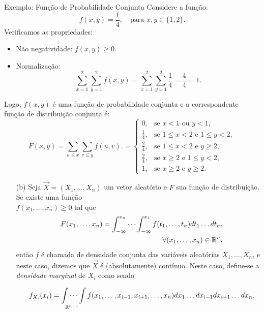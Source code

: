 \begin{frame}{Exemplo: Função de Probabilidade Conjunta}
	Considere a função:
	\[
	f(x, y) = \frac{1}{4}, \quad \text{para } x, y \in \{1, 2\}.
	\]
	Verificamos as propriedades:
	\begin{itemize}
		\item Não negatividade: $f(x, y) \geq 0$.
		\item Normalização:
		\[
		\sum_{x=1}^{2} \sum_{y=1}^{2} f(x, y) = \sum_{x=1}^{2} \sum_{y=1}^{2} \frac{1}{4} = \frac{4}{4} = 1.
		\]
	\end{itemize}
	Logo, $f(x, y)$ é uma função de probabilidade conjunta e a correspondente função de distribuição conjunta é:
%	
	\[
	F(x, y) = \sum_{u \leq x} \sum_{v \leq y} f(u, v). = 
	\begin{cases}
		0, & \text{se } x < 1 \text{ ou } y < 1, \\
		\frac{1}{4}, & \text{se } 1 \leq x < 2 \text{ e } 1 \leq y < 2, \\
		\frac{2}{4}, & \text{se } 1 \leq x < 2 \text{ e } y \geq 2, \\
		\frac{2}{4}, & \text{se } x \geq 2 \text{ e } 1 \leq y < 2, \\
		1, & \text{se } x \geq 2 \text{ e } y \geq 2.
	\end{cases}
	\]
\end{frame}




\begin{frame}
\begin{block}{}

\begin{enumerate}
\item[(b)] Seja $\vec{X}=(X_1,\ldots,X_n)$ um vetor aleatório e $F$ sua função de distribuição. Se existe uma função\\
$f(x_1,\ldots,x_n)\geq 0$ tal que
\begin{eqnarray}
& & F(x_1,\ldots,x_n)=\int_{-\infty}^{x_n}\cdots\int_{-\infty}^{x_1}f(t_1,\ldots,t_n)dt_1\ldots dt_n, \nonumber\\
& &\forall(x_1,\ldots,x_n)\in \mathbb{R}^n,\nonumber
\end{eqnarray}
então $f$ é chamada de densidade conjunta das variáveis aleatórias $X_1,\ldots,X_n$, e neste caso, dizemos que $\vec{X}$ é (absolutamente) contínuo. Neste caso, define-se a {\em densidade marginal} de $X_i$ como sendo

\begin{eqnarray}
& & f_{X_i}(x_i)=\idotsint\limits_{\mathbb{R}^{n-1}} f(x_1,\ldots,x_{i-1},x_{i+1},\ldots,x_n)dx_1\ldots
dx_{i-1}dx_{i+1}\ldots dx_n. \nonumber
\end{eqnarray}
\end{enumerate}

\end{block}
\end{frame}



